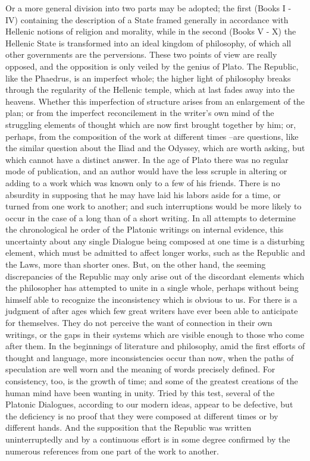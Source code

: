 Or a more general division into two parts may be adopted; the first (Books I - IV) containing the description of a State framed generally in accordance with Hellenic notions of religion and morality, while in the second (Books V - X) the Hellenic State is transformed into an ideal kingdom of philosophy, of which all other governments are the perversions. These two points of view are really opposed, and the opposition is only veiled by the genius of Plato. The Republic, like the Phaedrus, is an imperfect whole; the higher light of philosophy breaks through the regularity of the Hellenic temple, which at last fades away into the heavens. Whether this imperfection of structure arises from an enlargement of the plan; or from the imperfect reconcilement in the writer's own mind of the struggling elements of thought which are now first brought together by him; or, perhaps, from the composition of the work at different times --are questions, like the similar question about the Iliad and the Odyssey, which are worth asking, but which cannot have a distinct answer. In the age of Plato there was no regular mode of publication, and an author would have the less scruple in altering or adding to a work which was known only to a few of his friends. There is no absurdity in supposing that he may have laid his labors aside for a time, or turned from one work to another; and such interruptions would be more likely to occur in the case of a long than of a short writing. In all attempts to determine the chronological he order of the Platonic writings on internal evidence, this uncertainty about any single Dialogue being composed at one time is a disturbing element, which must be admitted to affect longer works, such as the Republic and the Laws, more than shorter ones. But, on the other hand, the seeming discrepancies of the Republic may only arise out of the discordant elements which the philosopher has attempted to unite in a single whole, perhaps without being himself able to recognize the inconsistency which is obvious to us. For there is a judgment of after ages which few great writers have ever been able to anticipate for themselves. They do not perceive the want of connection in their own writings, or the gaps in their systems which are visible enough to those who come after them. In the beginnings of literature and philosophy, amid the first efforts of thought and language, more inconsistencies occur than now, when the paths of speculation are well worn and the meaning of words precisely defined. For consistency, too, is the growth of time; and some of the greatest creations of the human mind have been wanting in unity. Tried by this test, several of the Platonic Dialogues, according to our modern ideas, appear to be defective, but the deficiency is no proof that they were composed at different times or by different hands. And the supposition that the Republic was written uninterruptedly and by a continuous effort is in some degree confirmed by the numerous references from one part of the work to another.

